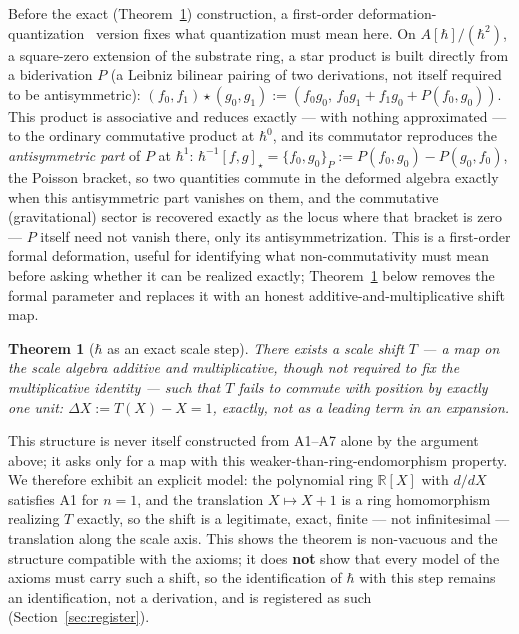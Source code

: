 \documentclass[aps,prd,twocolumn,superscriptaddress,nofootinbib]{revtex4-2}
\newtheorem{theorem}{Theorem}
\begin{document}
Before the exact (Theorem~\ref{thm:hbar}) construction, a first-order
deformation-quantization~\cite{Bayen1978} version fixes what
quantization must mean here. On $A[\hbar]/(\hbar^2)$,
a square-zero extension of the substrate ring, a star product is built
directly from a biderivation $P$ (a Leibniz bilinear pairing of two
derivations, not itself required to be antisymmetric):
$(f_0,f_1)\star(g_0,g_1) := (f_0g_0,\, f_0g_1+f_1g_0+P(f_0,g_0))$. This
product is associative and reduces exactly — with nothing approximated —
to the ordinary commutative product at $\hbar^0$, and its commutator
reproduces the \emph{antisymmetric part} of $P$ at $\hbar^1$:
$\hbar^{-1}[f,g]_\star = \{f_0,g_0\}_P := P(f_0,g_0)-P(g_0,f_0)$, the
Poisson bracket, so two quantities commute in the deformed algebra
exactly when this antisymmetric part vanishes on them, and the
commutative (gravitational) sector is recovered exactly as the locus
where that bracket is zero — $P$ itself need not vanish there, only its
antisymmetrization. This is a first-order formal deformation, useful for
identifying what non-commutativity must mean
before asking whether it can be realized exactly; Theorem~\ref{thm:hbar}
below removes the formal parameter and replaces it with an honest
additive-and-multiplicative shift map.

\begin{theorem}[$\hbar$ as an exact scale step]\label{thm:hbar}
There exists a scale shift $T$ — a map on the scale algebra additive and
multiplicative, though not required to fix the multiplicative identity —
such that $T$ fails to commute with position by exactly one unit:
$\Delta X := T(X)-X=1$, exactly, not as a leading term in an expansion.
\end{theorem}

This structure is never itself constructed from A1–A7 alone by the
argument above; it asks only for a map with this weaker-than-ring-endomorphism
property.
We therefore exhibit an explicit model: the polynomial ring
$\mathbb{R}[X]$ with $d/dX$ satisfies A1 for $n=1$, and the translation
$X\mapsto X+1$ is a ring homomorphism realizing $T$ exactly, so the shift
is a legitimate, exact, finite — not infinitesimal — translation along
the scale axis. This shows the theorem is non-vacuous and the structure
compatible with the axioms; it does \textbf{not} show that every model of
the axioms must carry such a shift, so the identification of $\hbar$ with
this step remains an identification, not a derivation, and is registered
as such (Section~\ref{sec:register}).
\end{document}
